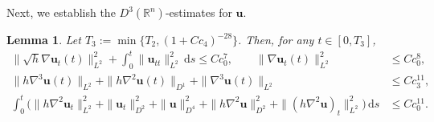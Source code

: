 \documentclass[11pt,reqno]{amsart}
\newtheorem{lem}{Lemma}[section]
\numberwithin{rk}{section}
\numberwithin{prop}{section}
\numberwithin{mydef}{section}
\numberwithin{lem}{section}
\numberwithin{equation}{section}
\numberwithin{thm}{section}
\begin{document}
Next, we establish the $D^3(\mathbb{R}^n)$-estimates for $\boldsymbol{u}$.
\begin{lem}\label{hu}
Let $T_3:=\min\{T_2,(1+Cc_4)^{-28}\}$. Then, for any $t\in [0, T_3]$, 
\begin{equation*} 
\begin{aligned}
\|\sqrt h\nabla \boldsymbol{u}_t(t)\|_{L^2}^2+\int^t_0\|\boldsymbol{u}_{tt}\|^2_{L^2}\,\mathrm{d}s\leq Cc^7_0,\qquad  \|\nabla \boldsymbol{u}_t(t)\|^2_{L^2}&\leq Cc^8_0,\\
\|h\nabla^3\boldsymbol{u}(t)\|_{L^2}+\|h\nabla^2\boldsymbol{u}(t)\|_{D^1}+\|\nabla^3\boldsymbol{u}(t)\|_{L^2}&\leq Cc^{11}_3,\\
\int^{t}_0\big(\|h\nabla^2\boldsymbol{u}_t\|^2_{L^2}+\|\boldsymbol{u}_t\|^2_{D^2}+\|\boldsymbol{u}\|^2_{D^4}+\|h\nabla^2\boldsymbol{u}\|_{D^2}^2+\|(h\nabla^2\boldsymbol{u})_t\|^2_{L^2}\big)\,\mathrm{d}s&\leq  Cc^{11}_0.
\end{aligned}
\end{equation*}
\end{lem}
\end{document}
